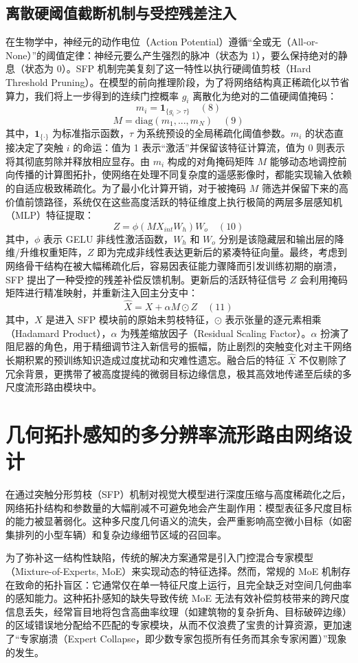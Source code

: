 \subsection{离散硬阈值截断机制与受控残差注入}
在生物学中，神经元的动作电位（Action Potential）遵循“全或无（All-or-None）”的阈值定律：神经元要么产生强烈的脉冲（状态为 1），要么保持绝对的静息（状态为 0）。SFP 机制完美复刻了这一特性以执行硬阈值剪枝（Hard Threshold Pruning）。在模型的前向推理阶段，为了将网络结构真正稀疏化以节省算力，我们将上一步得到的连续门控概率 $g_i$ 离散化为绝对的二值硬阈值掩码：$$m_i = \mathbf{1}_{\{g_i > \tau\}} \quad (8)$$$$M = \text{diag}(m_1, ..., m_N) \quad (9)$$其中，$\mathbf{1}_{\{\cdot\}}$ 为标准指示函数，$\tau$ 为系统预设的全局稀疏化阈值参数。$m_i$ 的状态直接决定了突触 $i$ 的命运：值为 1 表示“激活”并保留该特征计算流，值为 0 则表示将其彻底剪除并释放相应显存。由 $m_i$ 构成的对角掩码矩阵 $M$ 能够动态地调控前向传播的计算图拓扑，使网络在处理不同复杂度的遥感影像时，都能实现输入依赖的自适应极致稀疏化。为了最小化计算开销，对于被掩码 $M$ 筛选并保留下来的高价值前馈路径，系统仅在这些高度活跃的特征维度上执行极简的两层多层感知机（MLP）特征提取：$$Z = \phi(M X_{int} W_h) W_o \quad (10)$$其中，$\phi$ 表示 GELU 非线性激活函数，$W_h$ 和 $W_o$ 分别是该隐藏层和输出层的降维/升维权重矩阵，$Z$ 即为完成非线性表达更新后的紧凑特征向量。最终，考虑到网络骨干结构在被大幅稀疏化后，容易因表征能力骤降而引发训练初期的崩溃，SFP 提出了一种受控的残差补偿反馈机制。更新后的活跃特征信号 $Z$ 会利用掩码矩阵进行精准映射，并重新注入回主分支中：$$\hat{X} = X + \alpha M \odot Z \quad (11)$$其中，$X$ 是进入 SFP 模块前的原始未剪枝特征，$\odot$ 表示张量的逐元素相乘（Hadamard Product），$\alpha$ 为残差缩放因子（Residual Scaling Factor）。$\alpha$ 扮演了阻尼器的角色，用于精细调节注入新信号的振幅，防止剧烈的突触变化对主干网络长期积累的预训练知识造成过度扰动和灾难性遗忘。融合后的特征 $\hat{X}$ 不仅剔除了冗余背景，更携带了被高度提纯的微弱目标边缘信息，极其高效地传递至后续的多尺度流形路由模块中。

\section{几何拓扑感知的多分辨率流形路由网络设计}
在通过突触分形剪枝（SFP）机制对视觉大模型进行深度压缩与高度稀疏化之后，网络拓扑结构和参数量的大幅削减不可避免地会产生副作用：模型表征多尺度目标的能力被显著弱化。这种多尺度几何语义的流失，会严重影响高空微小目标（如密集排列的小型车辆）和复杂边缘细节区域的召回率。

为了弥补这一结构性缺陷，传统的解决方案通常是引入门控混合专家模型（Mixture-of-Experts, MoE）来实现动态的特征选择。然而，常规的 MoE 机制存在致命的拓扑盲区：它通常仅在单一特征尺度上运行，且完全缺乏对空间几何曲率的感知能力。这种拓扑感知的缺失导致传统 MoE 无法有效补偿剪枝带来的跨尺度信息丢失，经常盲目地将包含高曲率纹理（如建筑物的复杂折角、目标破碎边缘）的区域错误地分配给不匹配的专家模块，从而不仅浪费了宝贵的计算资源，更加速了“专家崩溃（Expert Collapse，即少数专家包揽所有任务而其余专家闲置）”现象的发生。

